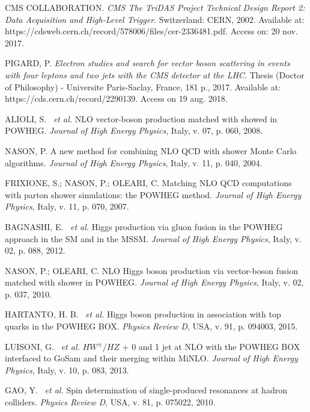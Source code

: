 \begin{thebibliography}{}
CMS COLLABORATION. \textit{CMS The TriDAS Project Technical Design Report 2: Data Acquisition and High-Level Trigger}. Switzerland: CERN, 2002. Available at: https://cdsweb.cern.ch/record/578006/files/cer-2336481.pdf. Access on: 20 nov. 2017.

PIGARD, P. \textit{Electron studies and search for vector boson scattering in events with four leptons and two jets with the CMS detector at the LHC}. Thesis (Doctor of Philosophy) - Universite Paris-Saclay, France, 181 p., 2017. Available at: https://cds.cern.ch/record/2290139. Access on 19 aug. 2018.


ALIOLI, S. ~\textit{et al.} NLO vector-boson production matched with showed in POWHEG. \textit{Journal of High Energy Physics}, Italy, v. 07, p. 060, 2008.
	
NASON, P. A new method for combining NLO QCD with shower Monte Carlo algorithms. \textit{Journal of High Energy Physics}, Italy, v. 11, p. 040, 2004.

FRIXIONE, S.; NASON, P.; OLEARI, C. Matching NLO QCD computations with parton shower simulations: the POWHEG method. \textit{Journal of High Energy Physics}, Italy, v. 11, p. 070, 2007.

BAGNASHI, E. ~\textit{et al.} Higgs production via gluon fusion in the POWHEG approach in the SM and in the MSSM. \textit{Journal of High Energy Physics}, Italy, v. 02, p. 088, 2012.

NASON, P.; OLEARI, C. NLO Higgs boson production via vector-boson fusion matched with shower in POWHEG. \textit{Journal of High Energy Physics}, Italy, v. 02, p. 037, 2010.

HARTANTO, H. B. ~\textit{et al.} Higgs boson production in association with top quarks in the POWHEG BOX. \textit{Physics Review D}, USA, v. 91, p. 094003, 2015.

LUISONI, G. ~\textit{et al.} $HW^{\pm}/HZ$ + 0 and 1 jet at NLO with the POWHEG BOX interfaced to GoSam and their merging within MiNLO. \textit{Journal of High Energy Physics}, Italy, v. 10, p. 083, 2013.

GAO, Y. ~\textit{et al.} Spin determination of single-produced resonances at hadron colliders. \textit{Physics Review D}, USA, v. 81, p. 075022, 2010.


\end{thebibliography}
